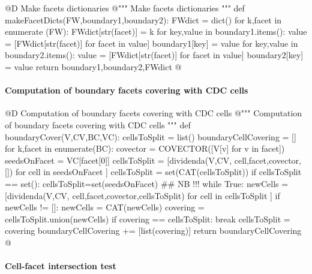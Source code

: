 \documentclass[11pt,oneside]{article}	%
\begin{document}
@D Make facets dictionaries
@{""" Make facets dictionaries """
def makeFacetDicts(FW,boundary1,boundary2):
	FWdict = dict()
	for k,facet in enumerate (FW): FWdict[str(facet)] = k
	for key,value in boundary1.items():
		value = [FWdict[str(facet)] for facet in value]
		boundary1[key] = value
	for key,value in boundary2.items():
		value = [FWdict[str(facet)] for facet in value]
		boundary2[key] = value
	return boundary1,boundary2,FWdict
@}


\paragraph{Computation of boundary facets covering with CDC cells}

@D Computation of boundary facets covering with CDC cells
@{""" Computation of boundary facets covering with CDC cells """
def boundaryCover(V,CV,BC,VC):
	cellsToSplit = list()
	boundaryCellCovering = []
	for k,facet in enumerate(BC):
		covector = COVECTOR([V[v] for v in facet])
		seedsOnFacet = VC[facet[0]]
		cellsToSplit = [dividenda(V,CV, cell,facet,covector,[]) 
							for cell in seedsOnFacet ]
		cellsToSplit = set(CAT(cellsToSplit))
		if cellsToSplit == set(): cellsToSplit=set(seedsOnFacet) ## NB !!!
		while True:
			newCells = [dividenda(V,CV, cell,facet,covector,cellsToSplit) 
							for cell in cellsToSplit ]
			if newCells != []: newCells = CAT(newCells)
			covering = cellsToSplit.union(newCells)
			if covering == cellsToSplit: 
				break
			cellsToSplit = covering
		boundaryCellCovering += [list(covering)]
	return boundaryCellCovering
@}

\paragraph{Cell-facet intersection test}
\end{document}
